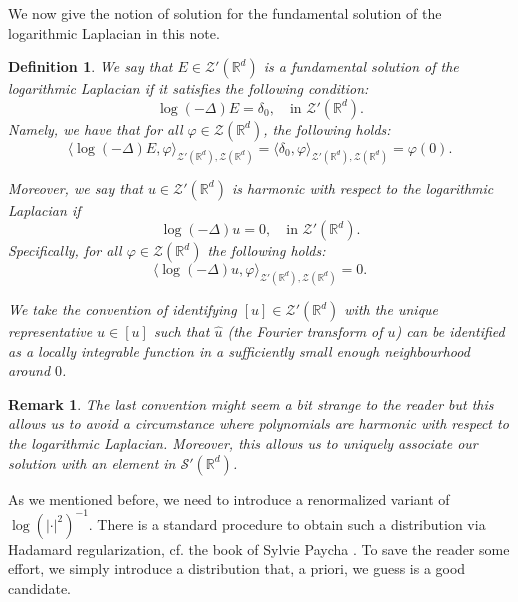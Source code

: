 \documentclass[11pt]{amsart}
\newcommand{\R}{\mathbb{R}}
\newtheorem{definition}{Definition}
\newtheorem{remark}{Remark}
\begin{document}
We now give the notion of solution for the fundamental solution of the logarithmic Laplacian in this note. 

\begin{definition}
\label{def:fundamental_soln_log}
	We say that $E\in \mathcal{Z}'(\mathbb{R}^d)$ is a fundamental solution of the logarithmic Laplacian if it satisfies the following condition:
	\begin{equation}\label{eqn:fundamental_solution_logarithmic_laplacian_def}
		\log(-\Delta)E=\delta_0, \quad \text{in }\mathcal{Z}'(\mathbb{R}^d).
	\end{equation}
	Namely, we have that for all $\varphi \in \mathcal{Z}(\mathbb{R}^d)$, the following holds:
	\begin{equation*}
		\langle \log(-\Delta)E,\varphi \rangle_{\mathcal{Z}'(\mathbb{R}^d),\mathcal{Z}(\mathbb{R}^d)}=\langle \delta_0,\varphi \rangle_{\mathcal{Z}'(\mathbb{R}^d),\mathcal{Z}(\mathbb{R}^d)}=\varphi(0).	
	\end{equation*}

	Moreover, we say that $u\in \mathcal{Z}'(\R^d)$ is harmonic with respect to the logarithmic Laplacian if
	\begin{equation}\label{eqn:harmonic}
		\log(-\Delta)u=0, \quad \text{in }\mathcal{Z}'(\mathbb{R}^d).
	\end{equation}
	Specifically, for all $\varphi \in \mathcal{Z}(\mathbb{R}^d)$ the following holds:
	\begin{equation*}
		\langle \log(-\Delta)u,\varphi \rangle_{\mathcal{Z}'(\mathbb{R}^d),\mathcal{Z}(\mathbb{R}^d)}=0.	
	\end{equation*}

	We take the convention of identifying $[u]\in \mathcal{Z}'(\R^d)$ with the unique representative $u\in [u]$ such that $\hat{u}$ (the Fourier transform of $u$) can be identified as a locally integrable function in a sufficiently small enough neighbourhood around $0$. 
\end{definition}

\begin{remark}\label{rem:unique_extension}
	The last convention might seem a bit strange to the reader but this allows us to avoid a circumstance where polynomials are harmonic with respect to the logarithmic Laplacian. Moreover, this allows us to uniquely associate our solution with an element in $\mathcal{S}'(\R^d)$.
\end{remark}
As we mentioned before, we need to introduce a renormalized variant of $\log(|\cdot|^2)^{-1}$. There is a standard procedure to obtain such a distribution via Hadamard regularization, cf. the book of Sylvie Paycha \cite{MR2987296}. To save the reader some effort, we simply introduce a distribution that, a priori, we guess is a good candidate. 
\end{document}
